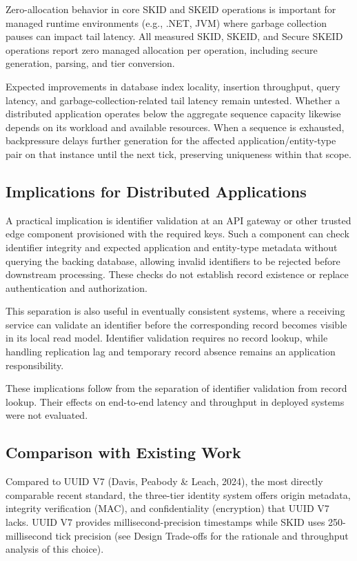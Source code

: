\documentclass[fleqn,10pt,lineno]{wlpeerj}
\begin{document}
Zero-allocation behavior in core SKID and SKEID operations is important
for managed runtime environments (e.g., .NET, JVM) where garbage
collection pauses can impact tail latency. All measured SKID, SKEID, and
Secure SKEID operations report zero managed allocation per operation,
including secure generation, parsing, and tier conversion.

Expected improvements in database index locality, insertion throughput,
query latency, and garbage-collection-related tail latency remain
untested. Whether a distributed application operates below the aggregate
sequence capacity likewise depends on its workload and available
resources. When a sequence is exhausted, backpressure delays further
generation for the affected application/entity-type pair on that
instance until the next tick, preserving uniqueness within that scope.

\subsection{Implications for Distributed
Applications}\label{implications-for-distributed-applications}

A practical implication is identifier validation at an API gateway or
other trusted edge component provisioned with the required keys. Such a
component can check identifier integrity and expected application and
entity-type metadata without querying the backing database, allowing
invalid identifiers to be rejected before downstream processing. These
checks do not establish record existence or replace authentication and
authorization.

This separation is also useful in eventually consistent systems, where a
receiving service can validate an identifier before the corresponding
record becomes visible in its local read model. Identifier validation
requires no record lookup, while handling replication lag and temporary
record absence remains an application responsibility.

These implications follow from the separation of identifier validation
from record lookup. Their effects on end-to-end latency and throughput
in deployed systems were not evaluated.

\subsection{Comparison with Existing
Work}\label{comparison-with-existing-work}

Compared to UUID V7 (Davis, Peabody \& Leach, 2024), the most directly
comparable recent standard, the three-tier identity system offers origin
metadata, integrity verification (MAC), and confidentiality (encryption)
that UUID V7 lacks. UUID V7 provides millisecond-precision timestamps
while SKID uses 250-millisecond tick precision (see Design Trade-offs
for the rationale and throughput analysis of this choice).
\end{document}

